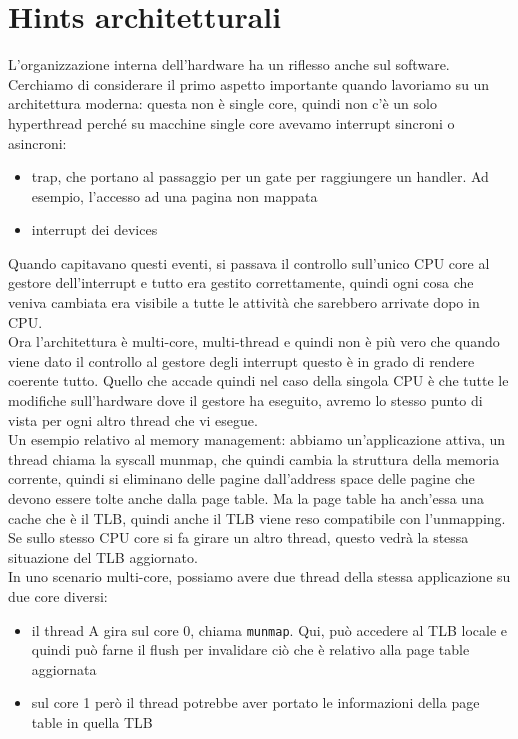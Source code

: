 \documentclass[12pt, oneside]{extbook}
\begin{document}
\section{Hints architetturali}
L'organizzazione interna dell'hardware ha un riflesso anche sul software. Cerchiamo di considerare il primo aspetto importante quando lavoriamo su un architettura moderna: questa non è single core, quindi non c'è un solo hyperthread perché su macchine single core avevamo interrupt sincroni o asincroni:
\begin{itemize}
\item trap, che portano al passaggio per un gate per raggiungere un handler. Ad esempio, l'accesso ad una pagina non mappata
\item interrupt dei devices
\end{itemize}
Quando capitavano questi eventi, si passava il controllo sull'unico CPU core al gestore dell'interrupt e tutto era gestito correttamente, quindi ogni cosa che veniva cambiata era visibile a tutte le attività che sarebbero arrivate dopo in CPU.\\Ora l'architettura è multi-core, multi-thread e quindi non è più vero che quando viene dato il controllo al gestore degli interrupt questo è in grado di rendere coerente tutto. Quello che accade quindi nel caso della singola CPU è che tutte le modifiche sull'hardware dove il gestore ha eseguito, avremo lo stesso punto di vista per ogni altro thread che vi esegue.\\Un esempio relativo al memory management: abbiamo un'applicazione attiva, un thread chiama la syscall munmap, che quindi cambia la struttura della memoria corrente, quindi si eliminano delle pagine dall'address space delle pagine che devono essere tolte anche dalla page table. Ma la page table ha anch'essa una cache che è il TLB, quindi anche il TLB viene reso compatibile con l'unmapping. Se sullo stesso CPU core si fa girare un altro thread, questo vedrà la stessa situazione del TLB aggiornato.\\In uno scenario multi-core, possiamo avere due thread della stessa applicazione su due core diversi:
\begin{itemize}
\item il thread A gira sul core 0, chiama \texttt{munmap}. Qui, può accedere al TLB locale e quindi può farne il flush per invalidare ciò che è relativo alla page table aggiornata
\item sul core 1 però il thread potrebbe aver portato le informazioni della page table in quella TLB
\end{itemize}
\end{document}

